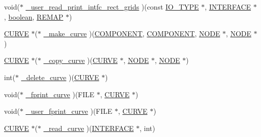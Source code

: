 \begin{DoxyCompactItemize}
\item 
void($\ast$ \hyperlink{struct___i___u_s_e_r___i_n_t_e_r_f_a_c_e_a79320ce0060ba93e1774616ad24bce63}{\+\_\+user\+\_\+read\+\_\+print\+\_\+intfc\+\_\+rect\+\_\+grids} )(const \hyperlink{cdecs_8h_ab53ca65803ae78b17636e622a6f2a062}{I\+O\+\_\+\+T\+Y\+PE} $\ast$, \hyperlink{int_8h_a58cf562d0d320a608294b7310ea167dc}{I\+N\+T\+E\+R\+F\+A\+CE} $\ast$, \hyperlink{cdecs_8h_ad048433382a936258fb49e2ec4f148e1}{boolean}, \hyperlink{geom_8h_a9f186bf2d7b393ae0b2f5568018b54e4}{R\+E\+M\+AP} $\ast$)
\item 
\hyperlink{int_8h_a4c1c272bef898dbaa20b055af85cd685}{C\+U\+R\+VE} $\ast$($\ast$ \hyperlink{struct___i___u_s_e_r___i_n_t_e_r_f_a_c_e_a97cc7d53f733076aed2fa43ac3f64d81}{\+\_\+make\+\_\+curve} )(\hyperlink{int_8h_a2bb7be12ca59ea6443c8757df0a7c278}{C\+O\+M\+P\+O\+N\+E\+NT}, \hyperlink{int_8h_a2bb7be12ca59ea6443c8757df0a7c278}{C\+O\+M\+P\+O\+N\+E\+NT}, \hyperlink{int_8h_a65acc517559b106aa8e5fe339247ddcd}{N\+O\+DE} $\ast$, \hyperlink{int_8h_a65acc517559b106aa8e5fe339247ddcd}{N\+O\+DE} $\ast$)
\item 
\hyperlink{int_8h_a4c1c272bef898dbaa20b055af85cd685}{C\+U\+R\+VE} $\ast$($\ast$ \hyperlink{struct___i___u_s_e_r___i_n_t_e_r_f_a_c_e_af4acf53705b8f56a59587908e2edb996}{\+\_\+copy\+\_\+curve} )(\hyperlink{int_8h_a4c1c272bef898dbaa20b055af85cd685}{C\+U\+R\+VE} $\ast$, \hyperlink{int_8h_a65acc517559b106aa8e5fe339247ddcd}{N\+O\+DE} $\ast$, \hyperlink{int_8h_a65acc517559b106aa8e5fe339247ddcd}{N\+O\+DE} $\ast$)
\item 
int($\ast$ \hyperlink{struct___i___u_s_e_r___i_n_t_e_r_f_a_c_e_a08a4b48c9c0468f0cbfed268a84c4b5a}{\+\_\+delete\+\_\+curve} )(\hyperlink{int_8h_a4c1c272bef898dbaa20b055af85cd685}{C\+U\+R\+VE} $\ast$)
\item 
void($\ast$ \hyperlink{struct___i___u_s_e_r___i_n_t_e_r_f_a_c_e_a2bef84bba4ed59fb8b8d43a2831240fa}{\+\_\+fprint\+\_\+curve} )(F\+I\+LE $\ast$, \hyperlink{int_8h_a4c1c272bef898dbaa20b055af85cd685}{C\+U\+R\+VE} $\ast$)
\item 
void($\ast$ \hyperlink{struct___i___u_s_e_r___i_n_t_e_r_f_a_c_e_a9d98cfd96b13954dae77ff3e2ccb05d3}{\+\_\+user\+\_\+fprint\+\_\+curve} )(F\+I\+LE $\ast$, \hyperlink{int_8h_a4c1c272bef898dbaa20b055af85cd685}{C\+U\+R\+VE} $\ast$)
\item 
\hyperlink{int_8h_a4c1c272bef898dbaa20b055af85cd685}{C\+U\+R\+VE} $\ast$($\ast$ \hyperlink{struct___i___u_s_e_r___i_n_t_e_r_f_a_c_e_a851ea66f39ac7a83131298a715eca8ab}{\+\_\+read\+\_\+curve} )(\hyperlink{int_8h_a58cf562d0d320a608294b7310ea167dc}{I\+N\+T\+E\+R\+F\+A\+CE} $\ast$, int)

\end{DoxyCompactItemize}
